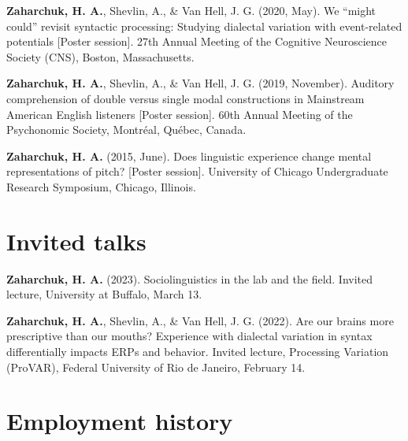 \documentclass[11pt,a4paper,]{awesome-cv}
\begin{document}
\leavevmode{}%
\textbf{\textbf{Zaharchuk, H.} A.}, Shevlin, A., \& Van Hell, J. G. (2020, May). We
{``might could''} revisit syntactic processing: Studying dialectal
variation with event-related potentials {[}Poster session{]}. 27th
Annual Meeting of the Cognitive Neuroscience Society (CNS), Boston,
Massachusetts.

\leavevmode{}%
\textbf{\textbf{Zaharchuk, H.} A.}, Shevlin, A., \& Van Hell, J. G. (2019, November).
Auditory comprehension of double versus single modal constructions in
Mainstream American English listeners {[}Poster session{]}. 60th Annual
Meeting of the Psychonomic Society, Montréal, Québec, Canada.

\leavevmode{}%
\textbf{\textbf{Zaharchuk, H.} A.} (2015, June). Does linguistic experience change mental
representations of pitch? {[}Poster session{]}. University of Chicago
Undergraduate Research Symposium, Chicago, Illinois.

\hypertarget{invited-talks}{%
\section{Invited talks}\label{invited-talks}}

\hypertarget{bibliography}{}
\leavevmode{}%
\textbf{\textbf{Zaharchuk, H.} A.} (2023). Sociolinguistics in the lab and the field.
Invited lecture, University at Buffalo, March 13.

\leavevmode{}%
\textbf{\textbf{Zaharchuk, H.} A.}, Shevlin, A., \& Van Hell, J. G. (2022). Are our brains
more prescriptive than our mouths? Experience with dialectal variation
in syntax differentially impacts ERPs and behavior. Invited lecture,
Processing Variation (ProVAR), Federal University of Rio de Janeiro,
February 14.

\hypertarget{employment-history}{%
\section{Employment history}\label{employment-history}}
\end{document}
